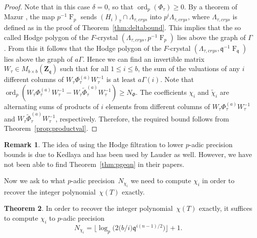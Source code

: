 \documentclass[a4paper,11pt]{article}
\numberwithin{equation}{section}
\providecommand{\floorbig}[1]{\bigl\lfloor#1\bigr\rfloor} %
\newcommand{\ZZ}{\mathbf{Z}} %
\DeclareMathOperator{\ord}{ord}          %
\DeclareMathOperator{\Frob}{F}           %
\theoremstyle{definition}
\newtheorem{thm}{Theorem}[section]
\newtheorem{rem}[thm]{Remark}
\begin{document}
\begin{proof} 
Note that in this case $\delta=0$, so that $\ord_p(\Phi_{\tau}) \geq 0$. 
By a theorem of Mazur \citep{Mazur1972}, the map $p^{-1} \Frob_p$ 
sends $(H_i)_{\hat{\tau}} \cap \Lambda_{\tau,crys}$ into $p^i \Lambda_{\tau,crys}$, 
where $\Lambda_{\tau,crys}$ is defined as in the proof of 
Theorem~\ref{thm:deltabound}. This implies that the so called Hodge polygon 
of the $F$-crystal $(\Lambda_{\tau,crys},p^{-1} \Frob_p)$ lies above the graph of 
$\Gamma$. From this it follows that the Hodge polygon of the $F$-crystal 
$(\Lambda_{\tau,crys},\mathfrak{q}^{-1} \Frob_{\mathfrak{q}})$ lies
above the graph of $a\Gamma$. Hence we can find an invertible matrix 
$W_{\tau} \in M_{b \times b}(\ZZ_{\mathfrak{q}})$ such that for all 
$1 \leq i \leq b$, the sum of the valuations of any $i$ different columns
of $W_{\tau} \Phi_{\tau}^{(a)} W_{\tau}^{-1}$ is at least $a\Gamma(i)$.
Note that 
$\ord_p(W_{\tau }\Phi_{\tau}^{(a)} W_{\tau}^{-1}-W_{\tau } \tilde{\Phi}_{\tau}^{(a)} W_{\tau}^{-1}) \geq N_{\Phi}$.
The coefficients $\chi_i$ and $\tilde{\chi}_i$ are alternating sums 
of products of $i$ elements from different columns of 
$W_{\tau }\Phi_{\tau}^{(a)} W_{\tau}^{-1}$ 
and $W_{\tau } \tilde{\Phi}_{\tau}^{(a)} W_{\tau}^{-1}$, respectively.  
Therefore, the required bound follows from Theorem~\ref{prop:productval}. 
\end{proof}

\begin{rem}
The idea of using the Hodge filtration to lower $p$-adic precision bounds is
due to Kedlaya and has been used by Lauder \citep[\S 9.3.2]{Lauder2006} as well. However, we have not
been able to find Theorem~\ref{thm:pgeqn} in their papers. 
\end{rem}

Now we ask to what $p$-adic precision~$N_{\chi_i}$ we need to compute $\chi_i$ 
in order to recover the integer polynomial~$\chi(T)$ exactly.

\begin{thm} \label{thm:N0}
In order to recover the integer polynomial~$\chi(T)$ exactly, 
it suffices to compute $\chi_i$ to $p$-adic precision 
\begin{equation*}
N_{\chi_i} = \floorbig{\log_p \bigl( 2 \bigl( b/i \bigr) \mathfrak{q}^{i (n-1) / 2} \bigr)} + 1.
\end{equation*}
\end{thm}
\end{document}
